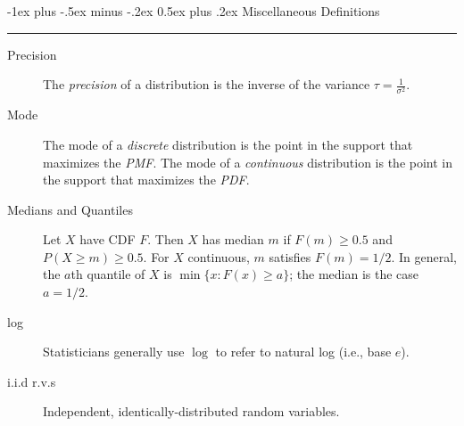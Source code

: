 \documentclass[10pt,landscape]{article}
\makeatletter
\renewcommand{\section}{\@startsection{section}{1}{0mm}%
                                {-1ex plus -.5ex minus -.2ex}%
                                {0.5ex plus .2ex}%
                                {\normalfont\large\bfseries}}
\renewcommand{\subsection}{\@startsection{subsection}{2}{0mm}%
                                {-1explus -.5ex minus -.2ex}%
                                {0.5ex plus .2ex}%
                                {\normalfont\normalsize\bfseries}}
\makeatother
\begin{document}
\begin{multicols*}{3}
\section{Miscellaneous Definitions} \smallskip \hrule height 2pt \smallskip

\begin{description}
  \item[Precision] The \emph{precision} of a distribution is the inverse of the variance $\tau=\frac{1}{\sigma^2}$.
  \item[Mode] The mode of a \emph{discrete} distribution is the point in the support that maximizes the \emph{PMF}.
  The mode of a \emph{continuous} distribution is the point in the support that maximizes the \emph{PDF}.
  \item[Medians and Quantiles] Let $X$ have CDF $F$. Then $X$ has median $m$ if $F(m) \geq 0.5$ and $P(X \geq m) \geq 0.5$. For $X$ continuous, $m$ satisfies $F(m)=1/2$. In general, the $a$th quantile of $X$ is $\min \{x: F(x)\geq a\}$; the median is the case $a=1/2$.
  \item[log] Statisticians generally use $\log$ to refer to natural log (i.e., base $e$).
  \item[i.i.d r.v.s] Independent, identically-distributed random variables.
\end{description}

%


\end{multicols*}
\end{document}
